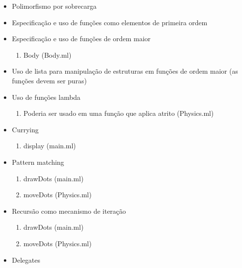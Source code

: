 \documentclass[a4paper,10pt]{article}
\begin{document}
\begin{itemize}
 \item Polimorfismo por sobrecarga
 \item Especificação e uso de funções como elementos de primeira ordem
 \item Especificação e uso de funções de ordem maior
 {\color{notDone}
		\begin{enumerate}
			\item Body (Body.ml)
		\end{enumerate}
		}
 \item Uso de lista para manipulação de estruturas em funções de ordem maior (as funções devem ser puras)
 \item Uso de funções lambda
		{\color{notDone}
		\begin{enumerate}
			\item Poderia ser usado em uma função que aplica atrito (Physics.ml)
		\end{enumerate}
		}
 \item Currying
		{\color{done}
		\begin{enumerate}
			\item display (main.ml)
		\end{enumerate}
		}
 \item Pattern matching
		{\color{done}
		\begin{enumerate}
			\item drawDots (main.ml)
			\item moveDots (Physics.ml)
		\end{enumerate}
		}
 \item Recursão como mecanismo de iteração
		{\color{done}
		\begin{enumerate}
			\item drawDots (main.ml)
			\item moveDots (Physics.ml)
		\end{enumerate}
		}
 \item Delegates


\end{itemize}
\end{document}
